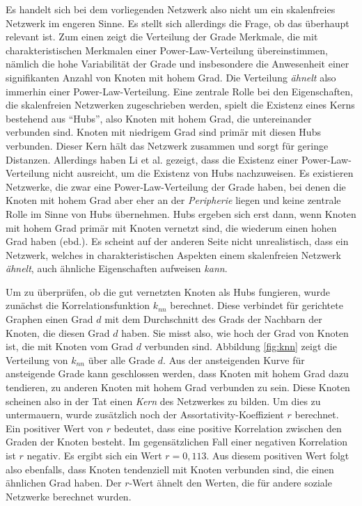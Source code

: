 Es handelt sich bei dem vorliegenden Netzwerk also nicht um ein
skalenfreies Netzwerk im engeren Sinne. Es stellt sich allerdings die
Frage, ob das \"uberhaupt relevant ist. Zum einen zeigt die Verteilung
der Grade Merkmale, die mit charakteristischen Merkmalen einer
Power-Law-Verteilung \"ubereinstimmen, n\"amlich die hohe
Variabilit\"at der Grade und insbesondere die Anwesenheit einer
signifikanten Anzahl von Knoten mit hohem Grad. Die Verteilung
\emph{\"ahnelt} also immerhin einer Power-Law-Verteilung. Eine
zentrale Rolle bei den Eigenschaften, die skalenfreien Netzwerken
zugeschrieben werden, spielt die Existenz eines Kerns bestehend aus
``Hubs'', also Knoten mit hohem Grad, die untereinander verbunden
sind. Knoten mit niedrigem Grad sind prim\"ar mit diesen Hubs
verbunden. Dieser Kern h\"alt das Netzwerk zusammen und sorgt f\"ur
geringe Distanzen. Allerdings haben Li et al. \cite{Li2005} gezeigt,
dass die Existenz einer Power-Law-Verteilung nicht ausreicht, um die
Existenz von Hubs nachzuweisen. Es existieren Netzwerke, die zwar eine
Power-Law-Verteilung der Grade haben, bei denen die Knoten mit hohem
Grad aber eher an der \emph{Peripherie} liegen und keine zentrale
Rolle im Sinne von Hubs \"ubernehmen.  Hubs ergeben sich erst dann,
wenn Knoten mit hohem Grad prim\"ar mit Knoten vernetzt sind, die
wiederum einen hohen Grad haben (ebd.). Es scheint auf der anderen
Seite nicht unrealistisch, dass ein Netzwerk, welches in
charakteristischen Aspekten einem skalenfreien Netzwerk
\emph{\"ahnelt}, auch \"ahnliche Eigenschaften aufweisen \emph{kann}.

Um zu \"uberpr\"ufen, ob die gut vernetzten Knoten als Hubs fungieren,
wurde zun\"achst die Korrelationsfunktion $k_{nn}$ berechnet. Diese
verbindet f\"ur gerichtete Graphen einen Grad $d$ mit dem Durchschnitt
des Grads der Nachbarn der Knoten, die diesen Grad $d$ haben. Sie
misst also, wie hoch der Grad von Knoten ist, die mit Knoten vom Grad
$d$ verbunden sind. Abbildung \ref{fig:knn} zeigt die Verteilung von
$k_{nn}$ \"uber alle Grade $d$. Aus der ansteigenden Kurve f\"ur
ansteigende Grade kann geschlossen werden, dass Knoten mit hohem Grad
dazu tendieren, zu anderen Knoten mit hohem Grad verbunden zu
sein. Diese Knoten scheinen also in der Tat einen \emph{Kern} des
Netzwerkes zu bilden. Um dies zu untermauern, wurde zus\"atzlich noch
der Assortativity-Koeffizient $r$ \cite{PhysRevLett.89.208701}
berechnet. Ein positiver Wert von $r$ bedeutet, dass eine positive
Korrelation zwischen den Graden der Knoten besteht. Im
gegens\"atzlichen Fall einer negativen Korrelation ist $r$ negativ. Es
ergibt sich ein Wert $r = 0,113$. Aus diesem positiven Wert folgt also
ebenfalls, dass Knoten tendenziell mit Knoten verbunden sind, die
einen \"ahnlichen Grad haben. Der $r$-Wert \"ahnelt den Werten, die
f\"ur andere soziale Netzwerke berechnet wurden\cite{newman:167}.

